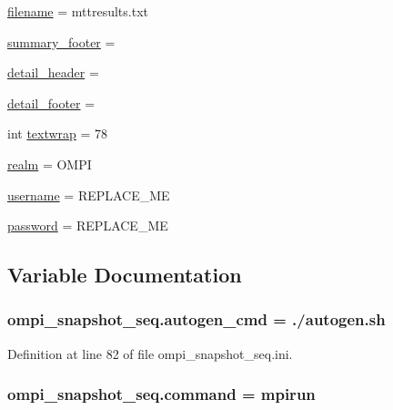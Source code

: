 \begin{DoxyCompactItemize}
\item 
\hyperlink{namespaceompi__snapshot__seq_ac375b04988441d39d7dbd8546bede172}{filename} = mttresults.\-txt
\item 
\hyperlink{namespaceompi__snapshot__seq_ae564d5d2ad344e6edd9fe25c04553c4f}{summary\-\_\-footer} =
\item 
\hyperlink{namespaceompi__snapshot__seq_aa8131df6b7e79ce54a5832a78a18226b}{detail\-\_\-header} =
\item 
\hyperlink{namespaceompi__snapshot__seq_a0238cbbb945d76de96b90e3cd058d356}{detail\-\_\-footer} =
\item 
int \hyperlink{namespaceompi__snapshot__seq_a81239e350a24a25aa3a329f330a267f4}{textwrap} = 78
\item 
\hyperlink{namespaceompi__snapshot__seq_aab43e86098df5461b6d69d6554bacf51}{realm} = O\-M\-P\-I
\item 
\hyperlink{namespaceompi__snapshot__seq_ad73553bb8a0851422895d9c7e8978b83}{username} = R\-E\-P\-L\-A\-C\-E\-\_\-\-M\-E
\item 
\hyperlink{namespaceompi__snapshot__seq_a6229810db63f8ab2e0598c9dc5da7a32}{password} = R\-E\-P\-L\-A\-C\-E\-\_\-\-M\-E
\end{DoxyCompactItemize}


\subsection{Variable Documentation}
\hypertarget{namespaceompi__snapshot__seq_a2e5939b3a3bd4bacecb7b4b33cad0313}{
\subsubsection[{autogen\-\_\-cmd}]{\setlength{\rightskip}{0pt plus 5cm}ompi\-\_\-snapshot\-\_\-seq.\-autogen\-\_\-cmd = ./autogen.\-sh}}\label{namespaceompi__snapshot__seq_a2e5939b3a3bd4bacecb7b4b33cad0313}


Definition at line 82 of file ompi\-\_\-snapshot\-\_\-seq.\-ini.

\hypertarget{namespaceompi__snapshot__seq_a7ee776e6bd84fc7f42f758751ba25e1e}{
\subsubsection[{command}]{\setlength{\rightskip}{0pt plus 5cm}ompi\-\_\-snapshot\-\_\-seq.\-command = mpirun}}\label{namespaceompi__snapshot__seq_a7ee776e6bd84fc7f42f758751ba25e1e}


